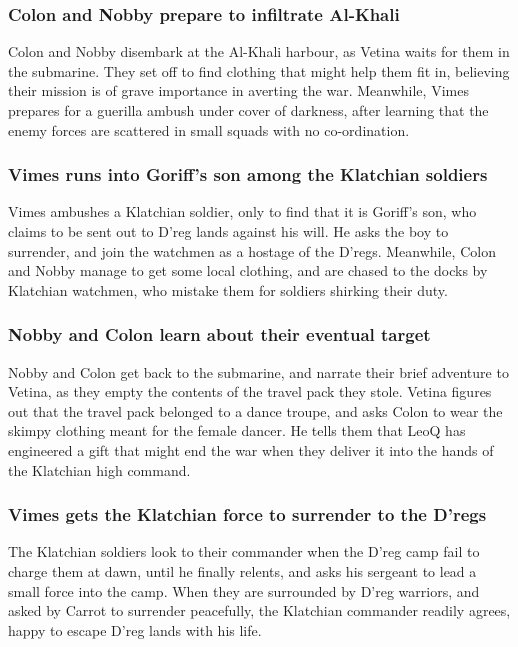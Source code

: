 \subsubsection{\Gls{Colon} and \Gls{Nobby} prepare to infiltrate Al-Khali}
\Gls{Colon} and \Gls{Nobby} disembark at the Al-Khali harbour, as \Gls{Vetina} waits for them in
the submarine. They set off to find clothing that might help them fit in, believing their mission
is of grave importance in averting the war. Meanwhile, \Gls{Vimes} prepares for a guerilla ambush
under cover of darkness, after learning that the enemy forces are scattered in small squads with no
co-ordination.

\subsubsection{\Gls{Vimes} runs into \Gls{Goriff}'s son among the Klatchian soldiers}
\Gls{Vimes} ambushes a Klatchian soldier, only to find that it is \Gls{Goriff}'s son, who claims to
be sent out to D'reg lands against his will. He asks the boy to surrender, and join the watchmen as
a hostage of the D'regs. Meanwhile, \Gls{Colon} and \Gls{Nobby} manage to get some local clothing,
and are chased to the docks by Klatchian watchmen, who mistake them for soldiers shirking their
duty.

\subsubsection{\Gls{Nobby} and \Gls{Colon} learn about their eventual target}
\Gls{Nobby} and \Gls{Colon} get back to the submarine, and narrate their brief adventure to
\Gls{Vetina}, as they empty the contents of the travel pack they stole. \Gls{Vetina} figures out
that the travel pack belonged to a dance troupe, and asks \Gls{Colon} to wear the skimpy clothing
meant for the female dancer. He tells them that \Gls{LeoQ} has engineered a gift that might end
the war when they deliver it into the hands of the Klatchian high command.

\subsubsection{\Gls{Vimes} gets the Klatchian force to surrender to the D'regs}
The Klatchian soldiers look to their commander when the D'reg camp fail to charge them at dawn,
until he finally relents, and asks his sergeant to lead a small force into the camp. When they are
surrounded by D'reg warriors, and asked by \Gls{Carrot} to surrender peacefully, the Klatchian
commander readily agrees, happy to escape D'reg lands with his life.

